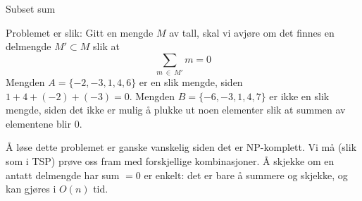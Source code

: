\newpage
\begin{example}
Subset sum

Problemet er slik: Gitt en mengde $ M $ av tall, skal vi avjøre om det finnes en delmengde $ M' \subset M $ slik at  \[ \sum_{m~\in~M'} m = 0  \] Mengden $ A =  \{-2, -3, 1, 4, 6\} $ er en slik mengde, siden $ 1 + 4 + (-2) + (-3) = 0 $. Mengden $ B = \{-6, -3, 1, 4, 7\} $ er ikke en slik mengde, siden det ikke er mulig å plukke ut noen elementer slik at summen av elementene blir 0.

Å løse dette problemet er ganske vanskelig siden det er NP-komplett. Vi må (slik som i TSP) prøve oss fram med forskjellige kombinasjoner. Å skjekke om en antatt delmengde har sum $ = 0 $ er enkelt: det er bare å summere og skjekke, og kan gjøres i $ O(n) $ tid. 
\end{example}
